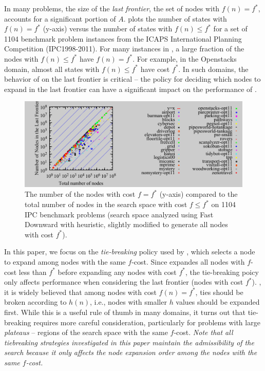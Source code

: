 In many problems, the size of the \emph{last frontier}, the set of nodes with $f(n)=f^*$, accounts for a significant portion of $A$.
 plots the number of states with $f(n) = f^*$ (y-axis)
versus the number of states with $f(n) \leq f^*$
for a set of 1104 benchmark problem instances from the ICAPS International Planning Competition (IPC1998-2011).
For many instances in ,  a large fraction of the nodes with $f(n) \leq f^*$ have $f(n)=f^*$.
For example, in the Openstacks domain, almost all states with $f(n) \leq f^*$ have cost $f^*$.
In such domains, the behavior of \astar on the last frontier is critical -- the policy for deciding which nodes to expand in the last frontier can have a significant impact on the performance of \astar.

\begin{figure}[tb]
 \centering {} 
 \includegraphics{tables/aaai16-frontier/aaai16prelim3/lmcut_frontier_noh-front.pdf}
 \caption{
 The number of the nodes with cost $f=f^*$ (y-axis) compared to the
 total number of nodes in the search space with cost $f\leq f^*$ on 1104 IPC benchmark problems
(search space analyzed using Fast Downward with \lmcut heuristic, slightly modified to generate all nodes with cost $f^*$).}
\label{fig:plateau-noh}
\end{figure}

In this paper, we focus on the \emph{tie-breaking} policy used by
\astar, which selects a node to expand among nodes with the same
$f$-cost.  Since \astar expandes all nodes with $f$-cost less than $f^*$
before expanding any nodes with cost $f^*$, the tie-breaking poicy only
affects performance when considering the last frontier (nodes with cost
$f^*$).  , it is widely believed that among nodes with
cost $f(n) = f^*$, ties should be broken according to $h(n)$, i.e.,
nodes with smaller $h$ values should be expanded first.  While this is a
useful rule of thumb in many domains, it turns out that tie-breaking
requires more careful consideration, particularly for problems with
large \emph{plateaus} -- regions of the search space with the same $f$-cost.
\emph{Note that all tiebreaking strategies investigated in this paper
maintain the admissibility of the search because it only affects the node expansion
order among the nodes with the same $f$-cost.}

